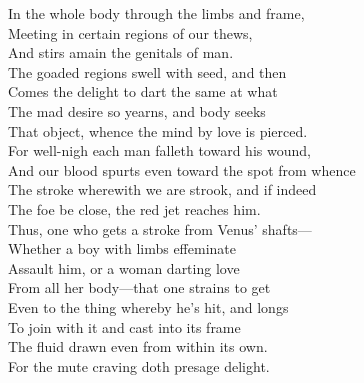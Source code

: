 In the whole body through the limbs and frame,\\
Meeting in certain regions of our thews,\\
And stirs amain the genitals of man.\\
The goaded regions swell with seed, and then\\
Comes the delight to dart the same at what\\
The mad desire so yearns, and body seeks\\
That object, whence the mind by love is pierced.\\
For well-nigh each man falleth toward his wound,\\
And our blood spurts even toward the spot from whence\\
The stroke wherewith we are strook, and if indeed\\
The foe be close, the red jet reaches him.\\
Thus, one who gets a stroke from Venus' shafts—\\
Whether a boy with limbs effeminate\\
Assault him, or a woman darting love\\
From all her body—that one strains to get\\
Even to the thing whereby he's hit, and longs\\
To join with it and cast into its frame\\
The fluid drawn even from within its own.\\
For the mute craving doth presage delight.



